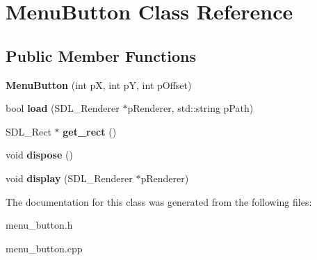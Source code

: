 \hypertarget{classMenuButton}{}\section{Menu\+Button Class Reference}
\label{classMenuButton}
\subsection*{Public Member Functions}
\begin{DoxyCompactItemize}
\item 
\mbox{\label{classMenuButton_a9922a6d61d2992feaaf613dcf119200e}} 
{\bfseries Menu\+Button} (int pX, int pY, int p\+Offset)
\item 
\mbox{\label{classMenuButton_a1050ba6e9798c670ca3b1990e4077e80}} 
bool {\bfseries load} (S\+D\+L\+\_\+\+Renderer $\ast$p\+Renderer, std\+::string p\+Path)
\item 
\mbox{\label{classMenuButton_a1a68b03f9a531df64b94e6d2ac7e4413}} 
S\+D\+L\+\_\+\+Rect $\ast$ {\bfseries get\+\_\+rect} ()
\item 
\mbox{\label{classMenuButton_a0fffd842253ead832b36bc9828ef0b73}} 
void {\bfseries dispose} ()
\item 
\mbox{\label{classMenuButton_a0907cb15f923bd151d25c692848babaa}} 
void {\bfseries display} (S\+D\+L\+\_\+\+Renderer $\ast$p\+Renderer)
\end{DoxyCompactItemize}


The documentation for this class was generated from the following files\+:\begin{DoxyCompactItemize}
\item 
menu\+\_\+button.\+h\item 
menu\+\_\+button.\+cpp\end{DoxyCompactItemize}
